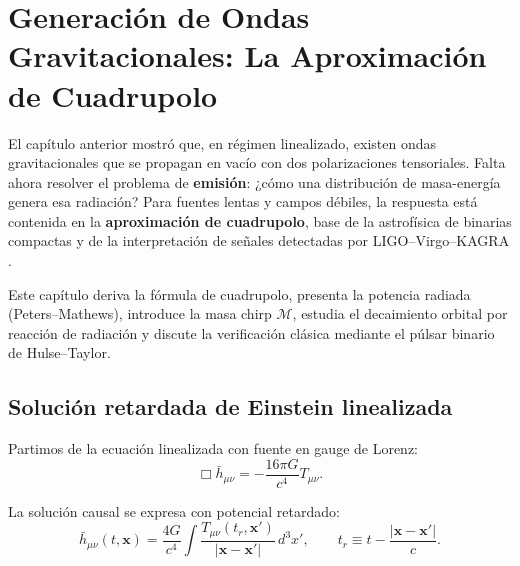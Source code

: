 
\chapter{Generación de Ondas Gravitacionales: La Aproximación de Cuadrupolo}
\label{cap:cuadrupolo}

El capítulo anterior mostró que, en régimen linealizado, existen ondas gravitacionales que se propagan en vacío con dos polarizaciones tensoriales. Falta ahora resolver el problema de \textbf{emisión}: ¿cómo una distribución de masa-energía genera esa radiación? Para fuentes lentas y campos débiles, la respuesta está contenida en la \textbf{aproximación de cuadrupolo}, base de la astrofísica de binarias compactas y de la interpretación de señales detectadas por LIGO--Virgo--KAGRA \cite{Maggiore2007, Maggiore2018, Peters1964, Abbott2016prl}.

Este capítulo deriva la fórmula de cuadrupolo, presenta la potencia radiada (Peters--Mathews), introduce la masa chirp $\mathcal{M}$, estudia el decaimiento orbital por reacción de radiación y discute la verificación clásica mediante el púlsar binario de Hulse--Taylor.

\section{Solución retardada de Einstein linealizada}
\label{sec:retarded_solution}

Partimos de la ecuación linealizada con fuente en gauge de Lorenz:
\begin{equation}
  \Box\bar h_{\mu\nu}=-\frac{16\pi G}{c^4}T_{\mu\nu}.
\end{equation}

La solución causal se expresa con potencial retardado:
\begin{equation}
  \bar h_{\mu\nu}(t,\mathbf{x})=
  \frac{4G}{c^4}
  \int
  \frac{T_{\mu\nu}(t_r,\mathbf{x}')}{|\mathbf{x}-\mathbf{x}'|}
  \,d^3x',
  \qquad
  t_r\equiv t-\frac{|\mathbf{x}-\mathbf{x}'|}{c}.
  \label{eq:retarded_h}
\end{equation}

